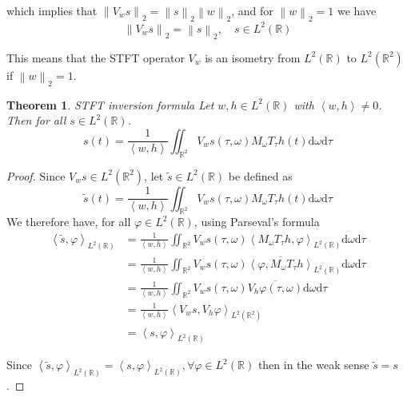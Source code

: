 \documentclass[american,]{article}
\newtheorem{thm}{Theorem}
\theoremstyle{definition}
\theoremstyle{definition}
\theoremstyle{definition}
\theoremstyle{remark}
\begin{document}
which implies that \(\left\lVert V_w s\right\rVert_2 = \left\lVert s\right\rVert_2 \left\lVert w\right\rVert_2\), and for \(\left\lVert w\right\rVert_2=1\) we have
\begin{equation}\label{eq:isometry}
\left\lVert V_w s\right\rVert_2 = \left\lVert s\right\rVert_2,\quad s\in L^2(\mathbb{R})
\end{equation}

This means that the STFT operator \(V_w\) is an isometry from \(L^2(\mathbb{R})\)
to \(L^2(\mathbb{R}^2)\) if \(\left\lVert w\right\rVert_2=1\).

\begin{thm}{STFT inversion formula}
Let $w,h\in L^2(\mathbb{R})$ with $\left\langle w,h\right\rangle\neq0$. Then for all $s\in L^2(\mathbb{R})$.
\begin{equation}
s(t) = \frac{1}{\left\langle w,h\right\rangle} \iint_{\mathbb{R}^2}V_w s(\tau,\omega)M_\omega T_\tau h(t) \mathrm{d}\omega\mathrm{d}\tau
\end{equation}
\end{thm}

\begin{proof}
Since $V_w s\in L^2(\mathbb{R}^2)$, let $\tilde s\in L^2(\mathbb{R})$ be defined as
\begin{equation}
\tilde s(t) = \frac{1}{\left\langle w,h\right\rangle} \iint_{\mathbb{R}^2}V_w s(\tau,\omega)M_\omega T_\tau h(t) \mathrm{d}\omega\mathrm{d}\tau
\end{equation}
We therefore have, for all $\varphi\in L^2(\mathbb{R})$, using Parseval's formula
\begin{align}
\left\langle\tilde s, \varphi\right\rangle_{L^2(\mathbb{R})}
&= \frac{1}{\left\langle w,h\right\rangle} \iint_{\mathbb{R}^2} V_w s(\tau,\omega) \left\langle M_\omega T_\tau h, \varphi\right\rangle_{L^2(\mathbb{R})} \mathrm{d}\omega\mathrm{d}\tau\\
&= \frac{1}{\left\langle w,h\right\rangle} \iint_{\mathbb{R}^2} V_w s(\tau,\omega) \overline{\left\langle\varphi,M_\omega T_\tau h\right\rangle}_{L^2(\mathbb{R})} \mathrm{d}\omega\mathrm{d}\tau\\
&= \frac{1}{\left\langle w,h\right\rangle} \iint_{\mathbb{R}^2} V_w s(\tau,\omega) \overline{V_h \varphi(\tau,\omega)} \mathrm{d}\omega\mathrm{d}\tau\\
&= \frac{1}{\left\langle w,h\right\rangle} \left\langle V_w s, V_h \varphi\right\rangle_{L^2(\mathbb{R}^2)}\\
&= \left\langle s, \varphi\right\rangle_{L^2(\mathbb{R})}
\end{align}

Since $\left\langle\tilde s,\varphi\right\rangle_{L^2(\mathbb{R})}=\left\langle s,\varphi\right\rangle_{L^2(\mathbb{R})},\forall\varphi\in L^2(\mathbb{R})$
then in the weak sense $\tilde s = s$.
\end{proof}
\end{document}
